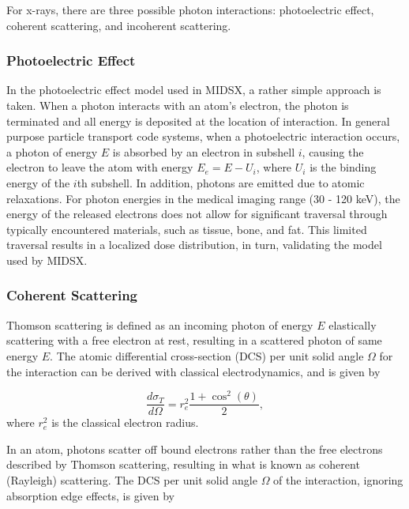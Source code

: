 \par For x-rays, there are three possible photon interactions: photoelectric effect, coherent scattering, and incoherent scattering.

\subsubsection{Photoelectric Effect}

\par In the photoelectric effect model used in MIDSX, a rather simple approach is taken. When a photon interacts with an atom's electron, the photon is terminated and all energy is deposited at the location of interaction. In general purpose particle transport code systems, when a photoelectric interaction occurs, a photon of energy $E$ is absorbed by an electron in subshell $i$, causing the electron to leave the atom with energy $E_e = E - U_i$, where $U_i$ is the binding energy of the $i$th subshell. In addition, photons are emitted due to atomic relaxations. For photon energies in the medical imaging range (30 - 120 keV), the energy of the released electrons does not allow for significant traversal through typically encountered materials, such as tissue, bone, and fat. This limited traversal results in a localized dose distribution, in turn, validating the model used by MIDSX.

\subsubsection{Coherent Scattering}

\par Thomson scattering is defined as an incoming photon of energy $E$ elastically scattering with a free electron at rest, resulting in a scattered photon of same energy $E$. The atomic differential cross-section (DCS) per unit solid angle $\Omega$ for the interaction can be derived with classical electrodynamics, and is given by

\begin{equation}
    \frac{d\sigma_T}{d\Omega} = r_e^2 \frac{1 + \cos^2(\theta)}{2},
\end{equation}
where $r_e^2$ is the classical electron radius.
\par In an atom, photons scatter off bound electrons rather than the free electrons described by Thomson scattering, resulting in what is known as coherent (Rayleigh) scattering. The DCS per unit solid angle $\Omega$ of the interaction, ignoring absorption edge effects, is given by

